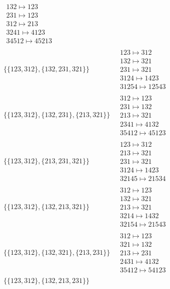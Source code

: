 \begin{scriptsize}
\begin{align}
\begin{matrix}
132 \mapsto 123\\231 \mapsto 123\\312 \mapsto 213\\3241 \mapsto 4123\\34512 \mapsto 45213
\end{matrix}
\\
\{\{123, 312\}, \{132, 231, 321\}\}
\ 
&
\begin{matrix}
123 \mapsto 312\\132 \mapsto 321\\231 \mapsto 321\\3124 \mapsto 1423\\31254 \mapsto 12543
\end{matrix}
\\
\{\{123, 312\}, \{132, 231\}, \{213, 321\}\}
\ 
&
\begin{matrix}
312 \mapsto 123\\231 \mapsto 132\\213 \mapsto 321\\2341 \mapsto 4132\\35412 \mapsto 45123
\end{matrix}
\\
\{\{123, 312\}, \{213, 231, 321\}\}
\ 
&
\begin{matrix}
123 \mapsto 312\\213 \mapsto 321\\231 \mapsto 321\\3124 \mapsto 1423\\32145 \mapsto 21534
\end{matrix}
\\
\{\{123, 312\}, \{132, 213, 321\}\}
\ 
&
\begin{matrix}
312 \mapsto 123\\132 \mapsto 321\\213 \mapsto 321\\3214 \mapsto 1432\\32154 \mapsto 21543
\end{matrix}
\\
\{\{123, 312\}, \{132, 321\}, \{213, 231\}\}
\ 
&
\begin{matrix}
312 \mapsto 123\\321 \mapsto 132\\213 \mapsto 231\\2431 \mapsto 4132\\35412 \mapsto 54123
\end{matrix}
\\
\{\{123, 312\}, \{132, 213, 231\}\}

\end{align}
\end{scriptsize}
